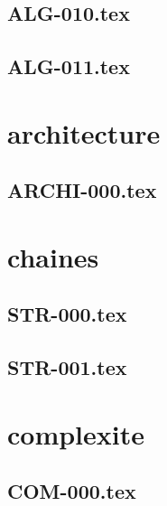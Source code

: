 \renewcommand{\xxexo}{ALG-010.tex} 
\subsection*{\xxexo} 
\graphicspath{{../../exosalgo/equadiffs/\xxexo/}}
 
 
\renewcommand{\xxexo}{ALG-011.tex} 
\subsection*{\xxexo} 
\graphicspath{{../../exosalgo/equadiffs/\xxexo/}}
 
 
\section*{architecture}
\renewcommand{\xxexo}{ARCHI-000.tex} 
\subsection*{\xxexo} 
\graphicspath{{../../exosarchitecture/equadiffs/\xxexo/}}
 
 
\section*{chaines}
\renewcommand{\xxexo}{STR-000.tex} 
\subsection*{\xxexo} 
\graphicspath{{../../exoschaines/equadiffs/\xxexo/}}
 
 
\renewcommand{\xxexo}{STR-001.tex} 
\subsection*{\xxexo} 
\graphicspath{{../../exoschaines/equadiffs/\xxexo/}}
 
 
\section*{complexite}
\renewcommand{\xxexo}{COM-000.tex} 
\subsection*{\xxexo} 
\graphicspath{{../../exoscomplexite/equadiffs/\xxexo/}}
 
 
